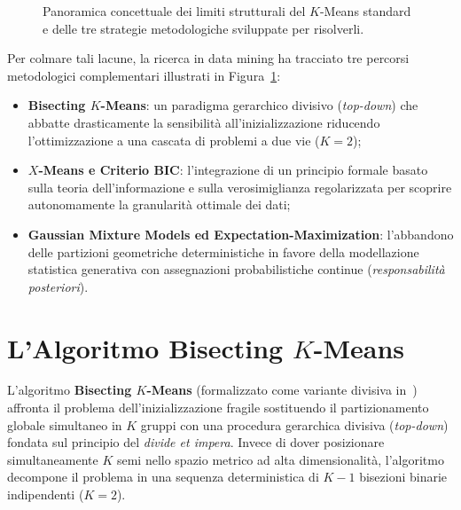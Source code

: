 \begin{figure}[H]
\caption{Panoramica concettuale dei limiti strutturali del $K$-Means standard e delle tre strategie metodologiche sviluppate per risolverli.}
\label{fig:dm-kmeans-limits-overview}
\end{figure}

Per colmare tali lacune, la ricerca in data mining ha tracciato tre percorsi metodologici complementari illustrati in Figura~\ref{fig:dm-kmeans-limits-overview}:
\begin{itemize}
    \item \textbf{Bisecting $K$-Means}: un paradigma gerarchico divisivo (\textit{top-down}) che abbatte drasticamente la sensibilità all'inizializzazione riducendo l'ottimizzazione a una cascata di problemi a due vie ($K=2$);
    \item \textbf{$X$-Means e Criterio BIC}: l'integrazione di un principio formale basato sulla teoria dell'informazione e sulla verosimiglianza regolarizzata per scoprire autonomamente la granularità ottimale dei dati;
    \item \textbf{Gaussian Mixture Models ed Expectation-Maximization}: l'abbandono delle partizioni geometriche deterministiche in favore della modellazione statistica generativa con assegnazioni probabilistiche continue (\textit{responsabilità posteriori}).
\end{itemize}

\FloatBarrier
\section{L'Algoritmo Bisecting \texorpdfstring{$K$}{K}-Means}
\label{sec:dm-bisecting-kmeans}

L'algoritmo \textbf{Bisecting $K$-Means} (formalizzato come variante divisiva in~\cite{tan2018}) affronta il problema dell'inizializzazione fragile sostituendo il partizionamento globale simultaneo in $K$ gruppi con una procedura gerarchica divisiva (\textit{top-down}) fondata sul principio del \textit{divide et impera}. Invece di dover posizionare simultaneamente $K$ semi nello spazio metrico ad alta dimensionalità, l'algoritmo decompone il problema in una sequenza deterministica di $K-1$ bisezioni binarie indipendenti ($K=2$).

